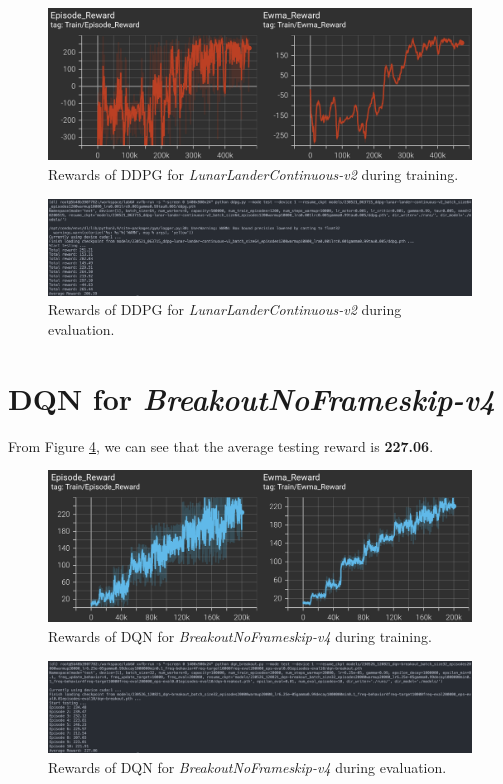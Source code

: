 	\begin{figure}[H]
		\centering
		\includegraphics[scale=0.6]{img/ddpg_train_reward.png}
		\caption{Rewards of DDPG for \textit{LunarLanderContinuous-v2} during training.}
		\label{ddpg-train-reward}
	\end{figure}
	\begin{figure}[H]
		\centering
		\includegraphics[width=\textwidth]{img/ddpg_test_reward.png}
		\caption{Rewards of DDPG for \textit{LunarLanderContinuous-v2} during evaluation.}
		\label{ddpg-test-reward}
	\end{figure}

\section{DQN for \textit{BreakoutNoFrameskip-v4}}
\indent
	From Figure \ref{dqn-breakout-test-reward}, we can see that the average testing reward is \textbf{227.06}.

	\begin{figure}[H]
		\centering
		\includegraphics[scale=0.6]{img/dqn_breakout_train_reward.png}
		\caption{Rewards of DQN for \textit{BreakoutNoFrameskip-v4} during training.}
		\label{dqn-breakout-train-reward}
	\end{figure}
	\begin{figure}[H]
		\centering
		\includegraphics[width=\textwidth]{img/dqn_breakout_test_reward.png}
		\caption{Rewards of DQN for \textit{BreakoutNoFrameskip-v4} during evaluation.}
		\label{dqn-breakout-test-reward}
	\end{figure}